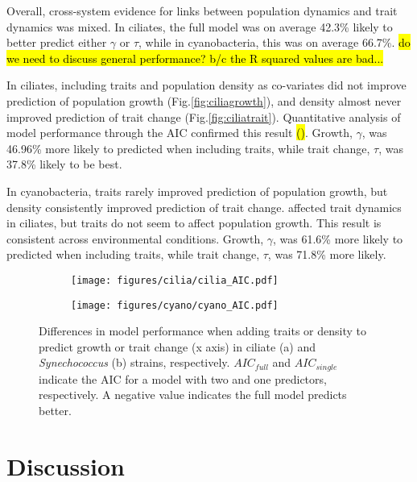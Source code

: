 \documentclass{getwriting}
\begin{document}
Overall, cross-system evidence for links between population dynamics and trait dynamics was mixed. In ciliates, the full model was on average 42.3\% likely to better predict either $\gamma$ or $\tau$, while in cyanobacteria, this was on average 66.7\%. \hl{do we need to discuss general performance? b/c the R squared values are bad...}

In ciliates, including traits and population density as co-variates did not improve prediction of population growth (Fig.\ref{fig:ciliagrowth}), and density almost never improved prediction of trait change (Fig.\ref{fig:ciliatrait}). Quantitative analysis of model performance through the AIC confirmed this result \hl{()}. Growth, $\gamma$, was 46.96\% more likely to predicted when including traits, while trait change, $\tau$, was 37.8\% likely to be best.

In cyanobacteria, traits rarely improved prediction of population growth, but density consistently improved prediction of trait change. affected trait dynamics in ciliates, but traits do not seem to affect population growth. This result is consistent across environmental conditions. Growth, $\gamma$, was 61.6\% more likely to predicted when including traits, while trait change, $\tau$, was 71.8\% more likely.

\begin{figure}[H]
    \begin{subfigure}{0.4\textwidth}
      \centering
      \texttt{[image: figures/cilia/cilia\_AIC.pdf]}
      \caption{}
    \label{fig:cilia_AIC}
    \end{subfigure}\hfill
        \begin{subfigure}{0.4\textwidth}
      \centering
      \texttt{[image: figures/cyano/cyano\_AIC.pdf]}
      \caption{}
      \label{fig:cyano_AIC}
    \end{subfigure}\hfill
    \centering
    \caption{Differences in model performance when adding traits or density to predict growth or trait change (x axis) in ciliate (a) and \textit{Synechococcus} (b) strains, respectively. $AIC_{full}$ and $AIC_{single}$ indicate the AIC for a model with two and one predictors, respectively. A negative value indicates the full model predicts better.}
  \label{fig:both_AIC}
\end{figure}

\section{Discussion}
\end{document}
